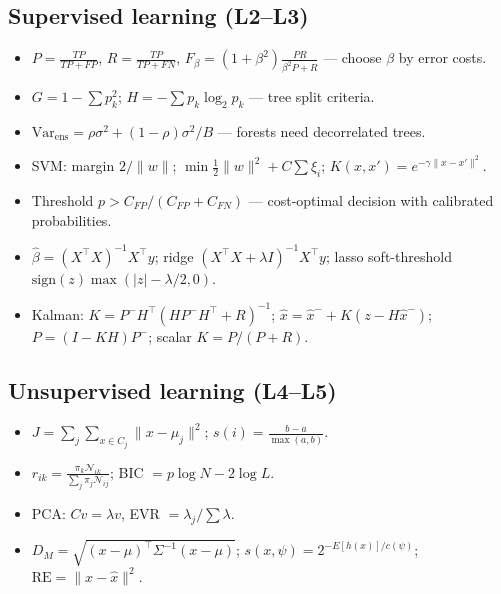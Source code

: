 \documentclass[11pt]{article}
\begin{document}
\subsection{Supervised learning (L2--L3)}
\begin{itemize}
\item $P=\frac{TP}{TP+FP}$, $R=\frac{TP}{TP+FN}$, $F_\beta=(1+\beta^2)\frac{PR}{\beta^2P+R}$ --- choose $\beta$ by error costs.
\item $G=1-\sum p_k^2$; $H=-\sum p_k\log_2p_k$ --- tree split criteria.
\item $\text{Var}_{\text{ens}}=\rho\sigma^2+(1-\rho)\sigma^2/B$ --- forests need decorrelated trees.
\item SVM: margin $2/\|w\|$; $\min\frac12\|w\|^2+C\sum\xi_i$; $K(x,x')=e^{-\gamma\|x-x'\|^2}$.
\item Threshold $p>C_{FP}/(C_{FP}+C_{FN})$ --- cost-optimal decision with calibrated probabilities.
\item $\hat\beta=(X^\top X)^{-1}X^\top y$; ridge $(X^\top X+\lambda I)^{-1}X^\top y$; lasso soft-threshold $\text{sign}(z)\max(|z|-\lambda/2,0)$.
\item Kalman: $K=P^-H^\top(HP^-H^\top+R)^{-1}$; $\hat x=\hat x^-+K(z-H\hat x^-)$; $P=(I-KH)P^-$; scalar $K=P/(P+R)$.
\end{itemize}
\subsection{Unsupervised learning (L4--L5)}
\begin{itemize}
\item $J=\sum_j\sum_{x\in C_j}\|x-\mu_j\|^2$; $s(i)=\frac{b-a}{\max(a,b)}$.
\item $r_{ik}=\frac{\pi_k\mathcal N_{ik}}{\sum_j\pi_j\mathcal N_{ij}}$; BIC $=p\log N-2\log L$.
\item PCA: $Cv=\lambda v$, EVR $=\lambda_j/\sum\lambda$.
\item $D_M=\sqrt{(x-\mu)^\top\Sigma^{-1}(x-\mu)}$; $s(x,\psi)=2^{-E[h(x)]/c(\psi)}$; $\text{RE}=\|x-\hat x\|^2$.
\end{itemize}
\end{document}
